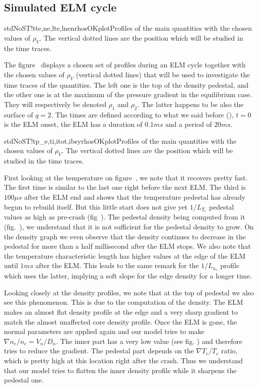 \subsection{Simulated ELM cycle}\label{sec:results:ELMs:cycle}
\begin{AllFigs}{stdNoST}{!t}{}{te,ne,lte,lne}{n}{rhosOKplot}{Profiles of the main quantities with the chosen values of $\rho_V$. The vertical dotted lines are the position which will be studied in the time traces.}
\end{AllFigs}
The figure~ displays a chosen set of profiles during an ELM cycle together with the chosen values of $\rho_V$ (vertical dotted lines) that will be used to investigate the time traces of the quantities. The left one is the top of the density pedestal, and the other one is at the maximum of the pressure gradient in the equilibrium case. They will respectively be denoted $\rho_1$ and $\rho_2$. The latter happens to be also the surface of $q = 2$. The times are defined according to what we said before (), $t = 0$ is the ELM onset, the ELM has a duration of $0.1ms$ and a period of $20ms$.

\begin{AllFigs}{stdNoST}{!t}{}{p_e,ti,itot,ibs}{y}{rhosOKplot}{Profiles of the main quantities with the chosen values of $\rho_V$. The vertical dotted lines are the position which will be studied in the time traces.}
\end{AllFigs}
First looking at the temperature on figure~, we note that it recovers pretty fast. The first time is similar to the last one right before the next ELM. The third is $100 \mu s$ after the ELM end and shows that the temperature pedestal has already begun to rebuild itself. But this little start does not give yet $1 / L_{T_e}$ pedestal values as high as pre-crash (fig~). The pedestal density being computed from it (fig.~), we understand that it is not sufficient for the pedestal density to grow. On the density graph we even observe that the density continues to decrease in the pedestal for more than a half millisecond after the ELM stops. We also note that the temperature characteristic length has higher values at the edge of the ELM until $1ms$ after the ELM. This leads to the same remark for the $1 / L_{n_e}$ profile which uses the latter, implying a soft slope for the edge density for a longer time.

Looking closely at the density profiles, we note that at the top of pedestal we also see this phenomenon. This is due to the computation of the density. The ELM makes an almost flat density profile at the edge and a very sharp gradient to match the almost unaffected core density profile. Once the ELM is gone, the normal parameters are applied again and our model tries to make $\nabla n_e / n_e = V_n / D_n$. The inner part has a very low value (see fig. ) and therefore tries to reduce the gradient. The pedestal part depends on the $\nabla T_e / T_e$ ratio, which is pretty high at this location right after the crash. Thus we understand that our model tries to flatten the inner density profile while it sharpens the pedestal one.

